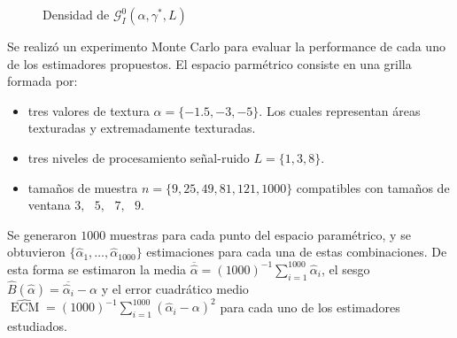 \begin{figure}[H]
	\centering
	\caption{\label{densidades}\small Densidad de $\mathcal{G}_I^0(\alpha,\gamma^*,L)$}
\end{figure}


Se realizó un experimento Monte Carlo para evaluar la performance de cada uno de los estimadores propuestos. El espacio parmétrico consiste en una grilla formada por:
\begin{itemize}
	\item tres valores de textura $\alpha=\{-1.5,-3,-5\}$. Los cuales representan áreas texturadas y extremadamente texturadas.
	\item tres niveles de procesamiento señal-ruido $L=\{1,3,8\}$.
	\item tamaños de muestra $n=\{9,25,49,81,121,1000\}$ compatibles con tamaños de ventana $3,\text{ }5,\text{ }7,\text{ }9$.
\end{itemize}

Se generaron $1000$ muestras para cada punto del espacio paramétrico, y se obtuvieron $\{\widehat{\alpha}_1, \dots, \widehat{\alpha}_{1000}\}$ estimaciones para cada una de estas combinaciones. De esta forma se estimaron la media $\overline{\widehat{\alpha}}=(1000)^{-1}{\sum_{i=1}^{1000}{\widehat{\alpha}_i}}$, el sesgo  $\widehat{B}(\widehat\alpha) = \overline{\widehat\alpha_i}- \alpha$ y el error cuadrático medio $\widehat{\operatorname{ECM}}=({1000})^{-1}{\sum_{i=1}^{1000}{(\widehat{\alpha}_i-\alpha)^2}}$ para cada uno de los estimadores estudiados.

